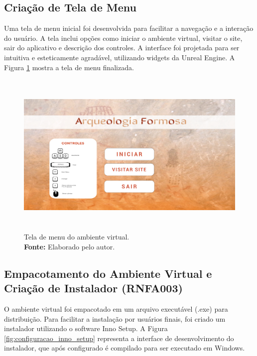 \subsection{Criação de Tela de Menu}
Uma tela de menu inicial foi desenvolvida para facilitar a navegação e a interação do usuário. A tela inclui opções como iniciar o ambiente virtual, visitar o site, sair do aplicativo e descrição dos controles.
A interface foi projetada para ser intuitiva e esteticamente agradável, utilizando widgets da Unreal Engine. A Figura \ref{fig:tela_menu} mostra a tela de menu finalizada.

\begin{figure}[H]
        \centering
        \includegraphics[height=8cm, keepaspectratio]{img/unreal/menu com controles.png}
        \caption{Tela de menu do ambiente virtual. \\
            \textbf{Fonte:} Elaborado pelo autor.}
        \label{fig:tela_menu}
\end{figure}


\subsection{Empacotamento do Ambiente Virtual e Criação de Instalador (RNFA003)}
O ambiente virtual foi empacotado em um arquivo executável (.exe) para distribuição. Para facilitar a instalação por usuários finais, foi criado um instalador utilizando o software Inno Setup. A Figura \ref{fig:configuracao_inno_setup} representa a interface de desenvolvimento do instalador, que após configurado é compilado para ser executado em Windows.

